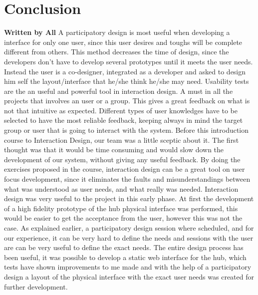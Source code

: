 \chapter{Conclusion}
\textbf{Written by All}\p
A participatory design is most useful when developing a interface for only one user, since this user desires and toughs will be complete different from others. This method decreases the time of design, since the developers don't have to develop several prototypes until it meets the user needs. Instead the user is a co-designer, integrated as a developer and asked to design him self the layout/interface that he/she think he/she may need. \p
Usability tests are the an useful and powerful tool in interaction design. A must in all the projects that involves an user or a group. This gives a great feedback on what is not that intuitive as expected. Different types of user knowledges have to be selected to have the most reliable feedback, keeping always in mind the target group or user that is going to interact with the system.\p
Before this introduction course to Interaction Design, our team was a little sceptic about it. The first thought was that it would be time consuming and would slow down the development of our system, without giving any useful feedback.\p
By doing the exercises proposed in the course, interaction design can be a great tool on user focus development, since it eliminates the faults and misunderstandings between what was understood as user needs, and what really was needed.\p
Interaction design was very useful to the project in this early phase. At first the development of a high fidelity prototype of the hub physical interface was performed, this would be easier to get the acceptance from the user, however this was not the case. As explained earlier, a participatory design session where scheduled, and for our experience, it can be very hard to define the needs and sessions with the user are can be very useful to define the exact needs.\p
The entire design process has been useful, it was possible to develop a static web interface for the hub, which tests have shown improvements to me made and with the help of a participatory design a layout of the physical interface with the exact user needs was created for further development.\p